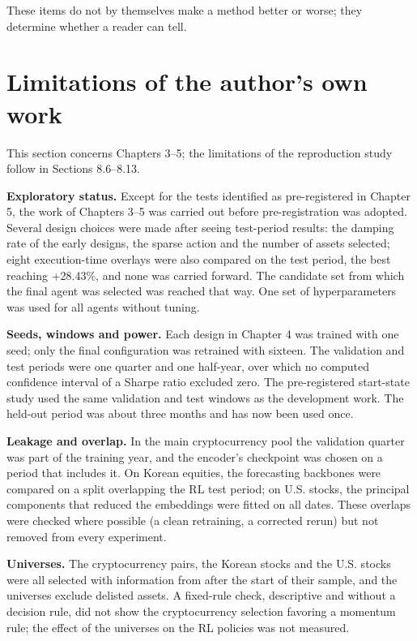 \documentclass[12pt,a4paper]{report}
\newcounter{none} %
\begin{document}
These items do not by themselves make a method better or worse; they
determine whether a reader can tell.

\section{Limitations of the author's own
work}\label{limitations-of-the-authors-own-work}

This section concerns Chapters 3--5; the limitations of the reproduction
study follow in Sections 8.6--8.13.

\textbf{Exploratory status.} Except for the tests identified as
pre-registered in Chapter 5, the work of Chapters 3--5 was carried out
before pre-registration was adopted. Several design choices were made
after seeing test-period results: the damping rate of the early designs,
the sparse action and the number of assets selected; eight
execution-time overlays were also compared on the test period, the best
reaching +28.43\%, and none was carried forward. The candidate set from
which the final agent was selected was reached that way. One set of
hyperparameters was used for all agents without tuning.

\textbf{Seeds, windows and power.} Each design in Chapter 4 was trained
with one seed; only the final configuration was retrained with sixteen.
The validation and test periods were one quarter and one half-year, over
which no computed confidence interval of a Sharpe ratio excluded zero.
The pre-registered start-state study used the same validation and test
windows as the development work. The held-out period was about three
months and has now been used once.

\textbf{Leakage and overlap.} In the main cryptocurrency pool the
validation quarter was part of the training year, and the encoder's
checkpoint was chosen on a period that includes it. On Korean equities,
the forecasting backbones were compared on a split overlapping the RL
test period; on U.S. stocks, the principal components that reduced the
embeddings were fitted on all dates. These overlaps were checked where
possible (a clean retraining, a corrected rerun) but not removed from
every experiment.

\textbf{Universes.} The cryptocurrency pairs, the Korean stocks and the
U.S. stocks were all selected with information from after the start of
their sample, and the universes exclude delisted assets. A fixed-rule
check, descriptive and without a decision rule, did not show the
cryptocurrency selection favoring a momentum rule; the effect of the
universes on the RL policies was not measured.
\end{document}

